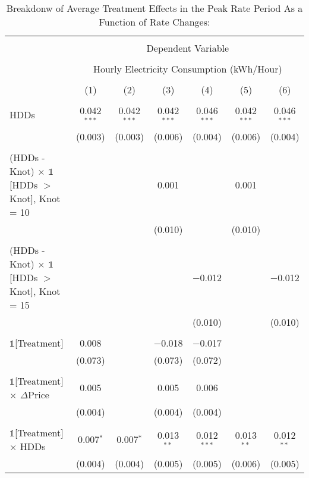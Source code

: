
\begin{table}[!htbp] \centering 
  \caption{Breakdonw of Average Treatment Effects in the Peak Rate Period As a Function of Rate Changes: } 
  \label{Table:Breakdown-of-Average-Treatement-Effects-in-the-Peak-Rate-Period_As-a-Function-of-Rate-Changes} 
\small 
\begin{tabular}{@{\extracolsep{20pt}}lcccccc} 
\\[-1.8ex]\hline 
\hline \\[-1.8ex] 
 & \multicolumn{6}{c}{Dependent Variable} \\ 
\cline{2-7} 
\\[-1.8ex] & \multicolumn{6}{c}{Hourly Electricity Consumption  (kWh/Hour)} \\ 
\\[-1.8ex] & (1) & (2) & (3) & (4) & (5) & (6)\\ 
\hline \\[-1.8ex] 
 HDDs & 0.042$^{***}$ & 0.042$^{***}$ & 0.042$^{***}$ & 0.046$^{***}$ & 0.042$^{***}$ & 0.046$^{***}$ \\ 
  & (0.003) & (0.003) & (0.006) & (0.004) & (0.006) & (0.004) \\ 
  & & & & & & \\ 
 (HDDs - Knot) $\times$ $\mathbb{1}$[HDDs $>$ Knot],  Knot = 10 &  &  & 0.001 &  & 0.001 &  \\ 
  &  &  & (0.010) &  & (0.010) &  \\ 
  & & & & & & \\ 
 (HDDs - Knot) $\times$ $\mathbb{1}$[HDDs $>$ Knot],  Knot = 15 &  &  &  & $-$0.012 &  & $-$0.012 \\ 
  &  &  &  & (0.010) &  & (0.010) \\ 
  & & & & & & \\ 
 $\mathbb{1}$[Treatment] & 0.008 &  & $-$0.018 & $-$0.017 &  &  \\ 
  & (0.073) &  & (0.073) & (0.072) &  &  \\ 
  & & & & & & \\ 
 $\mathbb{1}$[Treatment] $\times$ $\Delta$Price & 0.005 &  & 0.005 & 0.006 &  &  \\ 
  & (0.004) &  & (0.004) & (0.004) &  &  \\ 
  & & & & & & \\ 
 $\mathbb{1}$[Treatment] $\times$ HDDs & 0.007$^{*}$ & 0.007$^{*}$ & 0.013$^{**}$ & 0.012$^{***}$ & 0.013$^{**}$ & 0.012$^{**}$ \\ 
  & (0.004) & (0.004) & (0.005) & (0.005) & (0.006) & (0.005) \\ 

\end{tabular}
\end{table}
